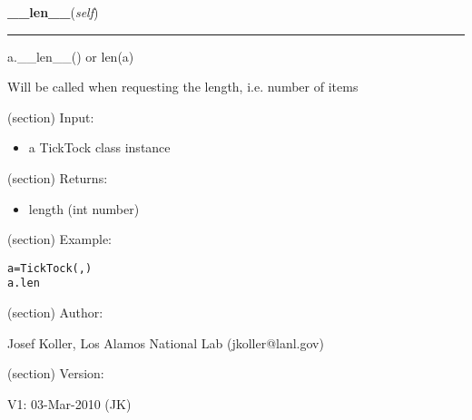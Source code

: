     \vspace{0.5ex}

\hspace{.8\funcindent}\begin{boxedminipage}{\funcwidth}

    \raggedright \textbf{\_\_len\_\_}(\textit{self})

    \vspace{-1.5ex}

    \rule{\textwidth}{0.5\fboxrule}
\setlength{\parskip}{2ex}
    a.\_\_len\_\_() or len(a)

    Will be called when requesting the length, i.e. number of items

    (section) Input:

      \begin{itemize}
      \setlength{\parskip}{0.6ex}
        \item a TickTock class instance

      \end{itemize}

    (section) Returns:

      \begin{itemize}
      \setlength{\parskip}{0.6ex}
        \item length (int number)

      \end{itemize}

    (section) Example:

\begin{alltt}
\pysrcprompt{{\textgreater}{\textgreater}{\textgreater} }a = TickTock(, )
\pysrcprompt{{\textgreater}{\textgreater}{\textgreater} }a.len
\end{alltt}
    (section) Author:

      Josef Koller, Los Alamos National Lab (jkoller@lanl.gov)

    (section) Version:

      V1: 03-Mar-2010 (JK)

\setlength{\parskip}{1ex}
    \end{boxedminipage}

    \label{spacepy:spacetime:TickTock:__cmp__}

    \vspace{0.5ex}

